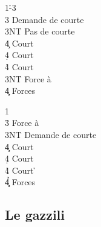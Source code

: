 \documentclass[a4paper]{article}
\begin{document}
\begin{bidtable}
1\h-3\d\\
3\s \> Demande de courte\+\\
3NT \> Pas de courte\+\\
4\c \> Court \c \\
4\d \> Court \d \\
4\h \> Court \s \-\-\\
3NT \> Force à \s \\
4\c\d \> Forces
\end{bidtable}

\begin{bidtable}
1\d\\
3\h \> Force à \h \\
3NT \> Demande de courte\+\\
4\c \> Court \c \\
4\d \> Court \d \\
4\h \> Court \h \-\\
4\c\d\h \> Forces
\end{bidtable}

\subsection{Le gazzili}
\end{document}
